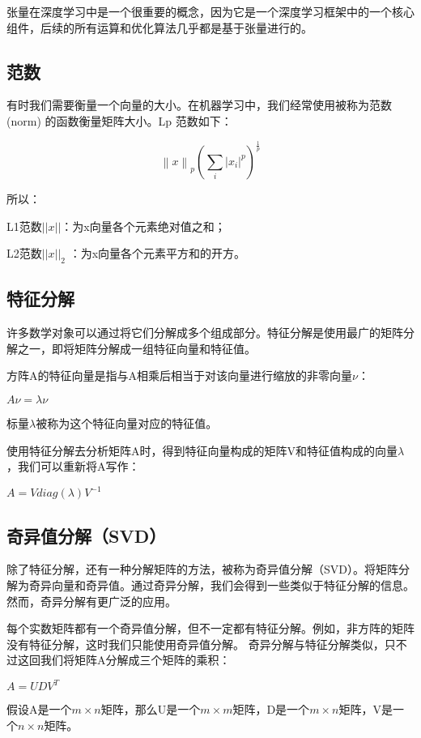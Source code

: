 \documentclass[11pt]{book}
\newcounter{#2}
\newcounter{#2}[#1]
\numberwithin{#2}{#1}
\begin{document}
张量在深度学习中是一个很重要的概念，因为它是一个深度学习框架中的一个核心组件，后续的所有运算和优化算法几乎都是基于张量进行的。

\subsection{范数}
有时我们需要衡量一个向量的大小。在机器学习中，我们经常使用被称为范数(norm) 的函数衡量矩阵大小。Lp 范数如下：
\begin{center}
	\begin{equation}
\left \| x \right \|_{p}\left ( \sum_{i}\left | x_{i} \right |^{p}  \right )^{\frac{1}{p}}
\end{equation}
\end{center}

所以：

L1范数$ \left| \left| x \right| \right| $：为x向量各个元素绝对值之和；

L2范数$ \left| \left| x \right|  \right| _{2} $ ：为x向量各个元素平方和的开方。

\subsection{特征分解}
许多数学对象可以通过将它们分解成多个组成部分。特征分解是使用最广的矩阵分解之一，即将矩阵分解成一组特征向量和特征值。

方阵A的特征向量是指与A相乘后相当于对该向量进行缩放的非零向量$ \nu $：

$ A\nu =\lambda \nu $

标量$ \lambda $被称为这个特征向量对应的特征值。 

使用特征分解去分析矩阵A时，得到特征向量构成的矩阵V和特征值构成的向量$ \lambda $，我们可以重新将A写作：

$ A=Vdiag\left( \lambda  \right) V^{-1} $

\subsection{奇异值分解（SVD）}
除了特征分解，还有一种分解矩阵的方法，被称为奇异值分解（SVD）。将矩阵分解为奇异向量和奇异值。通过奇异分解，我们会得到一些类似于特征分解的信息。然而，奇异分解有更广泛的应用。

每个实数矩阵都有一个奇异值分解，但不一定都有特征分解。例如，非方阵的矩阵没有特征分解，这时我们只能使用奇异值分解。
奇异分解与特征分解类似，只不过这回我们将矩阵A分解成三个矩阵的乘积：

\begin{center}
	$ A=UDV^{T} $ 
\end{center}
假设A是一个$ m\times n $矩阵，那么U是一个$ m\times m $矩阵，D是一个$ m\times n $矩阵，V是一个$ n\times n $矩阵。
\end{document}
